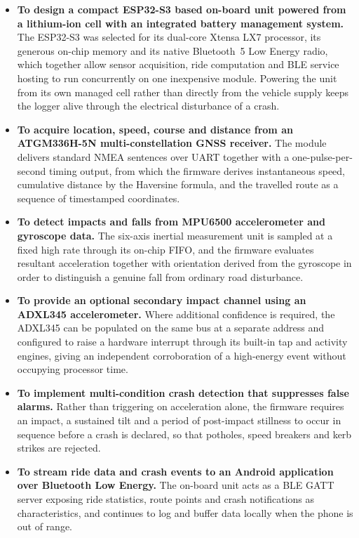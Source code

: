 \documentclass[12pt,a4paper,oneside]{report}
\begin{document}
\begin{itemize}[leftmargin=*,itemsep=0.7em,topsep=0.7em]
\item \textbf{To design a compact ESP32-S3 based on-board unit powered from a lithium-ion
cell with an integrated battery management system.} The ESP32-S3 was selected for its
dual-core Xtensa LX7 processor, its generous on-chip memory and its native Bluetooth~5 Low
Energy radio, which together allow sensor acquisition, ride computation and BLE service
hosting to run concurrently on one inexpensive module. Powering the unit from its own
managed cell rather than directly from the vehicle supply keeps the logger alive through the
electrical disturbance of a crash.

\item \textbf{To acquire location, speed, course and distance from an ATGM336H-5N
multi-constellation GNSS receiver.} The module delivers standard NMEA sentences over UART
together with a one-pulse-per-second timing output, from which the firmware derives
instantaneous speed, cumulative distance by the Haversine formula, and the travelled route
as a sequence of timestamped coordinates.

\item \textbf{To detect impacts and falls from MPU6500 accelerometer and gyroscope data.}
The six-axis inertial measurement unit is sampled at a fixed high rate through its on-chip
FIFO, and the firmware evaluates resultant acceleration together with orientation derived
from the gyroscope in order to distinguish a genuine fall from ordinary road disturbance.

\item \textbf{To provide an optional secondary impact channel using an ADXL345
accelerometer.} Where additional confidence is required, the ADXL345 can be populated on the
same bus at a separate address and configured to raise a hardware interrupt through its
built-in tap and activity engines, giving an independent corroboration of a high-energy
event without occupying processor time.

\item \textbf{To implement multi-condition crash detection that suppresses false alarms.}
Rather than triggering on acceleration alone, the firmware requires an impact, a sustained
tilt and a period of post-impact stillness to occur in sequence before a crash is declared,
so that potholes, speed breakers and kerb strikes are rejected.

\item \textbf{To stream ride data and crash events to an Android application over Bluetooth
Low Energy.} The on-board unit acts as a BLE GATT server exposing ride statistics, route
points and crash notifications as characteristics, and continues to log and buffer data
locally when the phone is out of range.


\end{itemize}
\end{document}

